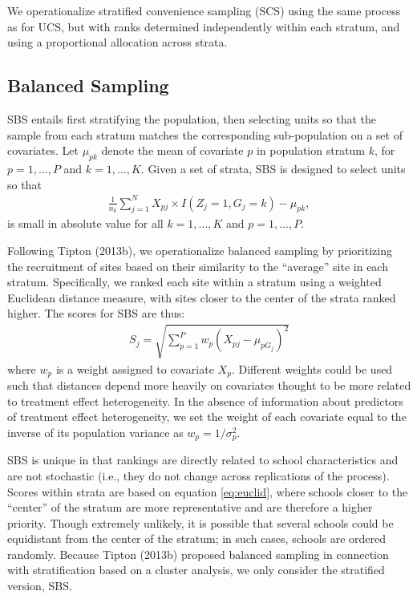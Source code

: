 \documentclass[
  english,
  man,floatsintext]{apa6}
\begin{document}
We operationalize stratified convenience sampling (SCS) using the same process as for UCS, but with ranks determined independently within each stratum, and using a proportional allocation across strata.

\hypertarget{balanced-sampling}{%
\subsection{Balanced Sampling}\label{balanced-sampling}}

SBS entails first stratifying the population, then selecting units so that the sample from each stratum matches the corresponding sub-population on a set of covariates. Let \(\mu_{p k}\) denote the mean of covariate \(p\) in population stratum \(k\), for \(p = 1,...,P\) and \(k = 1,...,K\). Given a set of strata, SBS is designed to select units so that
\begin{align}
\frac{1}{n_k} \sum_{j=1}^N X_{pj} \times I\left(Z_j = 1, G_j = k\right) - \mu_{p k},
\end{align}
is small in absolute value for all \(k = 1,...,K\) and \(p = 1,...,P\).

Following Tipton (2013b), we operationalize balanced sampling by prioritizing the recruitment of sites based on their similarity to the ``average'' site in each stratum.
Specifically, we ranked each site within a stratum using a weighted Euclidean distance measure, with sites closer to the center of the strata ranked higher. The scores for SBS are thus:
\begin{align} \label{eq:euclid}
S_j = \sqrt{\sum^P_{p=1}w_p(X_{pj} - \mu_{p G_j})^2}
\end{align}
where \(w_p\) is a weight assigned to covariate \(X_p\). Different weights could be used such that distances depend more heavily on covariates thought to be more related to treatment effect heterogeneity. In the absence of information about predictors of treatment effect heterogeneity, we set the weight of each covariate equal to the inverse of its population variance as \(w_p = 1/\sigma^2_p\).

SBS is unique in that rankings are directly related to school characteristics and are not stochastic (i.e., they do not change across replications of the process).
Scores within strata are based on equation \eqref{eq:euclid}, where schools closer to the ``center'' of the stratum are more representative and are therefore a higher priority. Though extremely unlikely, it is possible that several schools could be equidistant from the center of the stratum; in such cases, schools are ordered randomly. Because Tipton (2013b) proposed balanced sampling in connection with stratification based on a cluster analysis, we only consider the stratified version, SBS.
\end{document}
